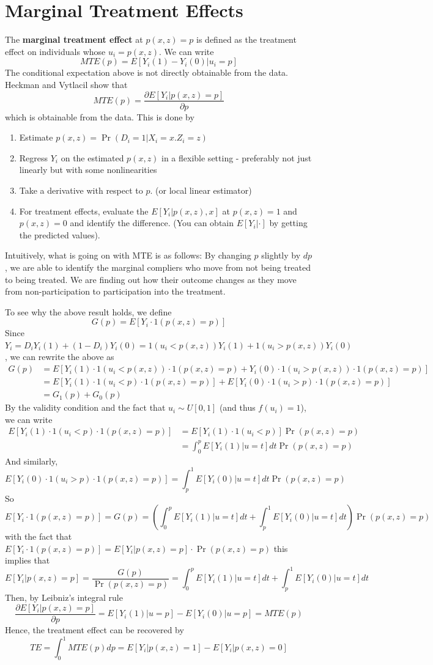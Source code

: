 \section{Marginal Treatment Effects}
The \textbf{marginal treatment effect} at $p(x,z)=p$ is defined as the treatment effect on individuals whose $u_i=p(x,z)$. We can write
\[
MTE(p)=E[Y_i(1)-Y_i(0)| u_i=p]
\]
The conditional expectation above is not directly obtainable from the data. Heckman and Vytlacil show that 
\[
MTE(p)=\frac{\partial E[Y_i | p(x,z)=p]}{\partial p}
\]
which is obtainable from the data. This is done by 
\begin{enumerate}
\item Estimate $p(x,z)=\Pr(D_i=1|X_i=x. Z_i=z)$
\item Regress $Y_i$ on the estimated $p(x,z)$ in a flexible setting - preferably not just linearly but with some nonlinearities
\item Take a derivative with respect to $p$. (or local linear estimator)
\item For treatment effects, evaluate the $E[Y_i|p(x,z),x]$ at $p(x,z)=1$ and $p(x,z)=0$ and identify the difference. (You can obtain $E[Y_i|\cdot]$ by getting the predicted values).  
\end{enumerate}
\par
Intuitively, what is going on with MTE is as follows: By changing $p$ slightly by $dp$, we are able to identify the marginal compliers who move from not being treated to being treated. We are finding out how their outcome changes as they move from non-participation to participation into the treatment. \par
To see why the above result holds, we define
\[
G(p)=E[Y_i\cdot 1(p(x,z)=p)]
\]
Since $Y_i=D_iY_i(1)+(1-D_i)Y_i(0)=1(u_i<p(x,z))Y_i(1)+1(u_i>p(x,z))Y_i(0)$, we can rewrite the above as
\begin{align*}
G(p)&=E[Y_i(1)\cdot 1(u_i<p(x,z))\cdot 1(p(x,z)=p)+Y_i(0)\cdot 1(u_i>p(x,z))\cdot 1(p(x,z)=p)]\\
&=E[Y_i(1)\cdot 1(u_i<p)\cdot 1(p(x,z)=p)]+E[Y_i(0)\cdot 1(u_i>p)\cdot 1(p(x,z)=p)]\\
&=G_1(p)+G_0(p)
\end{align*}
By the validity condition and the fact that $u_i\sim U[0,1]$ (and thus $f(u_i)=1$), we can write
\begin{align*}
E[Y_i(1)\cdot 1(u_i<p)\cdot 1(p(x,z)=p)]&=E[Y_i(1)\cdot 1(u_i<p)]\Pr(p(x,z)=p)\\
&=\int_0^pE[Y_i(1)|u=t]dt\Pr(p(x,z)=p)
\end{align*}
And similarly, 
\[
E[Y_i(0)\cdot 1(u_i>p)\cdot 1(p(x,z)=p)]=\int_p^1E[Y_i(0)|u=t]dt\Pr(p(x,z)=p)
\]
So 
\footnotesize{\[
E[Y_i\cdot 1(p(x,z)=p)]=G(p)=\left(\int_0^pE[Y_i(1)|u=t]dt+\int_p^1E[Y_i(0)|u=t]dt\right)\Pr(p(x,z)=p)
\]}\normalsize
with the fact that $E[Y_i\cdot 1(p(x,z)=p)]=E[Y_i|p(x,z)=p]\cdot \Pr(p(x,z)=p) $ this implies that
\footnotesize{\[
E[Y_i|p(x,z)=p]=\frac{G(p)}{\Pr(p(x,z)=p)}=\int_0^pE[Y_i(1)|u=t]dt+\int_p^1E[Y_i(0)|u=t]dt
\]}\normalsize
Then, by Leibniz's integral rule
\[
\frac{\partial E[Y_i | p(x,z)=p]}{\partial p}=E[Y_i(1)|u=p]-E[Y_i(0)|u=p]=MTE(p)
\]
Hence, the treatment effect can be recovered by
\[
TE=\int_0^1MTE(p)dp=E[Y_i|p(x,z)=1]-E[Y_i|p(x,z)=0]
\]


